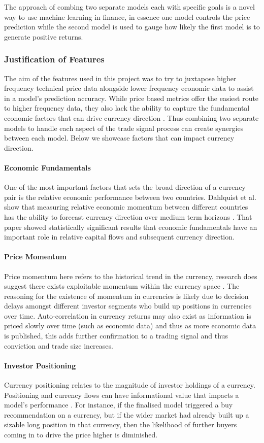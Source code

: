 \documentclass[11pt]{article}
\begin{document}
The approach of combing two separate models each with specific goals is a novel way to use machine learning in finance, in essence one model controls the price prediction while the second model is used to gauge how likely the first model is to generate positive returns.

\subsubsection{Justification of Features}
The aim of the features used in this project was to try to juxtapose higher frequency technical price data alongside lower frequency economic data to assist in a model's prediction accuracy. While price based metrics offer the easiest route to higher frequency data, they also lack the ability to capture the fundamental economic factors that can drive currency direction \cite{medium}. Thus combining two separate models to handle each aspect of the trade signal process can create synergies between each model. 
Below we showcase factors that can impact currency direction.
\paragraph{Economic Fundamentals} 
One of the most important factors that sets the broad direction of a currency pair is the relative economic performance between two countries.
Dahlquist et al. show that measuring relative economic momentum between different countries has the ability to forecast currency direction over medium term horizons \cite{Dahlquist2015}. That paper showed statistically significant results that economic fundamentals have an important role in relative capital flows and subsequent currency direction.
\paragraph{Price Momentum}
Price momentum here refers to the historical trend in the currency,  research does suggest there exists  exploitable momentum within the currency space \cite{Moskowitz2012}. The reasoning for the existence of momentum in currencies is likely due to decision delays amongst different investor segments who build up positions in currencies over time. Auto-correlation in currency returns may also exist as information is priced slowly over time (such as economic data) and thus as more economic data is published, this adds further confirmation to a trading signal and thus conviction and trade size increases.
\paragraph{Investor Positioning}
Currency positioning relates to the magnitude of investor holdings of a currency. Positioning and currency flows can have informational value that impacts a model's performance \cite{Menkhoff2012}. For instance, if the finalised model triggered a buy recommendation on a currency, but if the wider market had already built up a sizable long position in that currency, then the likelihood of further buyers coming in to drive the price higher is diminished.
\end{document}
